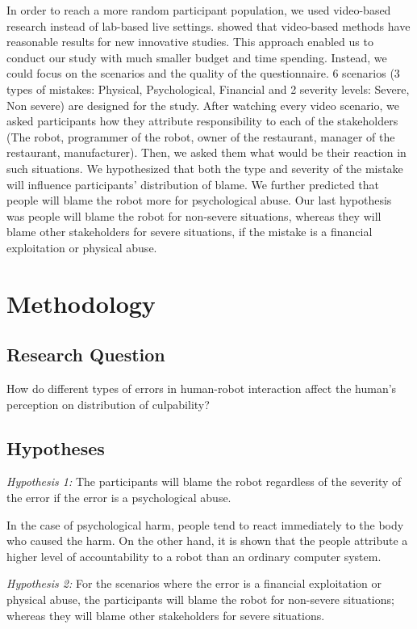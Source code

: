 \documentclass{sigchi}
\begin{document}
In order to reach a more random participant population, we used video-based research instead of lab-based live settings. \cite{woods2006comparing} showed that video-based methods have reasonable results for new innovative studies. This approach enabled us to conduct our study with much smaller budget and time spending. Instead, we could focus on the scenarios and the quality of the questionnaire. 6 scenarios (3 types of mistakes: Physical, Psychological, Financial and 2 severity levels: Severe, Non severe) are designed for the study. After watching every video scenario, we asked participants how they attribute responsibility to each of the stakeholders (The robot, programmer of the robot, owner of the restaurant, manager of the restaurant, manufacturer). Then, we asked them what would be their reaction in such situations. We hypothesized that both the type and severity of the mistake will influence participants' distribution of blame. We further predicted that people will blame the robot more for psychological abuse. Our last hypothesis was people will blame the robot for non-severe situations, whereas they will blame other stakeholders for severe situations, if the mistake is a financial exploitation or physical abuse.

\section{Methodology}
\subsection{Research Question}
How do different types of errors in human-robot interaction affect the human’s perception on distribution of culpability?

\subsection{Hypotheses}
\textit{Hypothesis 1:} The participants will blame the robot regardless of the severity of the error if the error is a psychological abuse.

In the case of psychological harm, people tend to react immediately to the body who caused the harm. On the other hand, it is shown that the people attribute a higher level of accountability to a robot than an ordinary computer system.

\textit{Hypothesis 2:} For the scenarios where the error is a financial exploitation or physical abuse, the participants will blame the robot for non-severe situations; whereas they will blame other stakeholders for severe situations.
\end{document}
